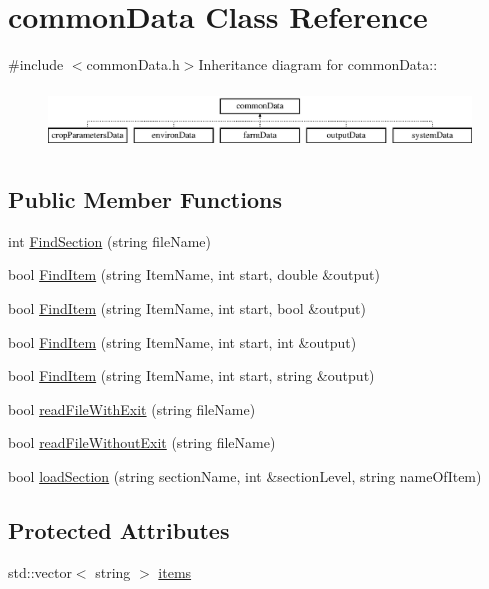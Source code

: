 \hypertarget{classcommon_data}{
\section{commonData Class Reference}
\label{classcommon_data}
}


{\ttfamily \#include $<$commonData.h$>$}Inheritance diagram for commonData::\begin{figure}[H]
\begin{center}
\leavevmode
\includegraphics[height=1.64706cm]{classcommon_data}
\end{center}
\end{figure}
\subsection*{Public Member Functions}
\begin{DoxyCompactItemize}
\item 
int \hyperlink{classcommon_data_aa4d72251ad8be8a2b7f67ded16543844}{FindSection} (string fileName)
\item 
bool \hyperlink{classcommon_data_a93c4b682fc807b027c7f382af5c7a456}{FindItem} (string ItemName, int start, double \&output)
\item 
bool \hyperlink{classcommon_data_a46254c46ab80006b173b6e1c85790842}{FindItem} (string ItemName, int start, bool \&output)
\item 
bool \hyperlink{classcommon_data_a9890851d4ca83d9290d793a5dbb8fdab}{FindItem} (string ItemName, int start, int \&output)
\item 
bool \hyperlink{classcommon_data_aee279b2c8519ac55eed8942a8b9f028f}{FindItem} (string ItemName, int start, string \&output)
\item 
bool \hyperlink{classcommon_data_a583bb536c664640b9b80b9273189cbfc}{readFileWithExit} (string fileName)
\item 
bool \hyperlink{classcommon_data_a7f0be4abb327aa4a77bf3728bd9d41ec}{readFileWithoutExit} (string fileName)
\item 
bool \hyperlink{classcommon_data_a3072a95f6f561c067a4193845e423100}{loadSection} (string sectionName, int \&sectionLevel, string nameOfItem)
\end{DoxyCompactItemize}
\subsection*{Protected Attributes}
\begin{DoxyCompactItemize}
\item 
std::vector$<$ string $>$ \hyperlink{classcommon_data_a8526d429650c48d9e1b8b1462b78f452}{items}
\end{DoxyCompactItemize}


